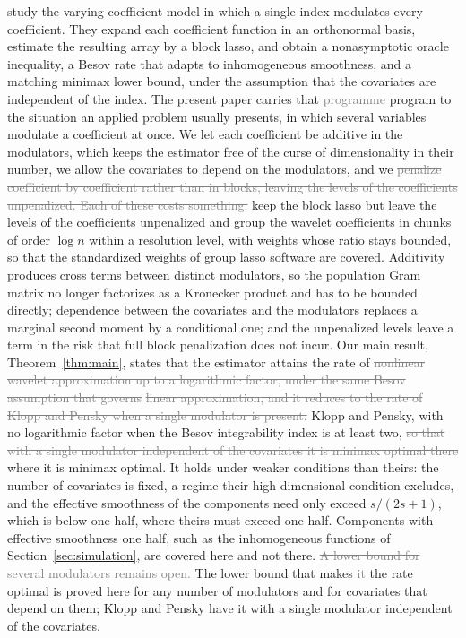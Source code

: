 \documentclass[12pt]{article} %
\theoremstyle{definition}
\theoremstyle{plain}
\begin{document}
\citet{Klopp-Pensky-2015} study the varying coefficient model in which a
single index modulates every coefficient. They expand each coefficient
function in an orthonormal basis, estimate the resulting array by a block
lasso, and obtain a nonasymptotic oracle inequality, a Besov rate that adapts
to inhomogeneous smoothness, and a matching minimax lower bound, under the
assumption that the covariates are independent of the index. The present paper
carries that \textcolor{gray}{\sout{programme}} \textcolor{colR1}{program} to the situation an applied problem usually presents,
in which several variables modulate a coefficient at once. We let each
coefficient be additive in the modulators, which keeps the estimator free of
the curse of dimensionality in their number, we allow the covariates to depend
on the modulators, and we \textcolor{gray}{\sout{penalize coefficient by coefficient rather than in
blocks, leaving the levels of the coefficients unpenalized. Each of these
costs something.}} \textcolor{colR1}{keep the block lasso but leave the levels of the
coefficients unpenalized and group the wavelet coefficients in chunks of order
$\log n$ within a resolution level, with weights whose ratio stays bounded, so
that the standardized weights of group lasso software are covered.}
Additivity produces cross terms between distinct modulators,
so the population Gram matrix no longer factorizes as a Kronecker product and
has to be bounded directly; dependence between the covariates and the
modulators replaces a marginal second moment by a conditional one; and the
unpenalized levels leave a term in the risk that \textcolor{colR1}{full} block penalization does not
incur. Our main result, Theorem~\ref{thm:main}, states that the estimator
attains the rate of \textcolor{gray}{\sout{nonlinear wavelet approximation up to a logarithmic
factor, under the same Besov assumption that governs}} \textcolor{gray}{\sout{linear approximation}}\textcolor{gray}{\sout{, and it
reduces to the rate of Klopp and Pensky when a single modulator is present.}}
\textcolor{colR1}{Klopp and Pensky, with no logarithmic factor when the Besov integrability
index is at least two, \textcolor{gray}{\sout{so that with a single modulator independent of the
covariates it is minimax optimal there}}
where it is minimax optimal. It holds under weaker conditions than
theirs: the number of covariates is fixed, a regime their high dimensional
condition excludes, and the effective smoothness of the components need only
exceed $s/(2s+1)$, which is below one half, where theirs must exceed one half.
Components with effective smoothness one half, such as the inhomogeneous
functions of Section~\ref{sec:simulation}, are covered here and not there. \textcolor{gray}{\sout{A lower bound for
several modulators remains open.}}
The lower bound that makes \textcolor{gray}{\sout{it}} the rate optimal is proved here for any number of
modulators and for covariates that depend on them; Klopp and Pensky have it
with a single modulator independent of the covariates.}
\end{document}
